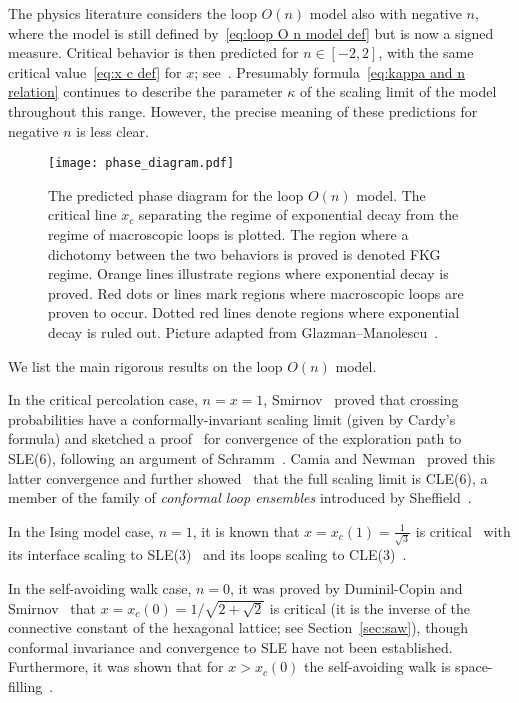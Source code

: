 \documentclass[12pt,reqno]{article}
\begin{document}
The physics literature considers the loop $O(n)$ model also with negative $n$, where the model is still defined by~\eqref{eq:loop O n model def} but is now a signed measure. Critical behavior is then predicted for $n\in [-2,2]$, with the same critical value~\eqref{eq:x c def} for $x$; see~\cite{Nie82}. Presumably formula~\eqref{eq:kappa and n relation} continues to describe the parameter $\kappa$ of the scaling limit of the model throughout this range. However, the precise meaning of these predictions for negative $n$ is less clear.

\begin{figure}[t]
	\begin{center}
		\texttt{[image: phase\_diagram.pdf]}
	\end{center}
	\caption{The predicted phase diagram for the loop $O(n)$ model. The critical line $x_c$ separating the regime of exponential decay from the regime of macroscopic loops is plotted. The region where a dichotomy between the two behaviors is proved is denoted FKG regime. Orange lines illustrate regions where exponential decay is proved. Red dots or lines mark regions where macroscopic loops are proven to occur. Dotted red lines denote regions where exponential decay is ruled out. Picture adapted from Glazman--Manolescu~\cite{glazman2018exponential}.}
	\label{fig:phase diagram}
\end{figure}

\medbreak
We list the main rigorous results on the loop $O(n)$ model.

In the critical percolation case, $n= x = 1$, Smirnov~\cite{Smi01} proved that crossing probabilities have a conformally-invariant
scaling limit (given by Cardy's formula) and sketched a proof~\cite{Smi01,Smi06} for convergence of the exploration path to SLE(6), following an argument of Schramm~\cite{Sch00}. Camia and Newman~\cite{CamNew07} proved this latter convergence and further showed~\cite{camia2004continuum,camia2005full,CamNew06} that the full scaling limit is CLE(6), a member of the family of \emph{conformal loop ensembles} introduced by Sheffield~\cite{sheffield2009exploration}.

In the Ising model case, $n=1$, it is known that $x = x_c(1) = \frac{1}{\sqrt{3}}$ is critical~\cite{Ons44} with its interface scaling to SLE(3)~\cite{Smi10,CheSmi12,HonKyt13,CheDumHon14,izyurov2015smirnov} and its loops scaling to CLE(3)~\cite{benoist2016scaling}.

In the self-avoiding walk case, $n=0$, it was proved by Duminil-Copin and Smirnov~\cite{DumSmi12} that $x=x_c(0) = 1/\sqrt{2 + \sqrt{2}}$ is critical (it is the inverse of the connective constant of the hexagonal lattice; see Section~\ref{sec:saw}), though conformal invariance and convergence
to SLE have not been established. Furthermore, it was shown that for $x > x_c(0)$ the self-avoiding walk is space-filling~\cite{DumKozYad11}.
\end{document}
